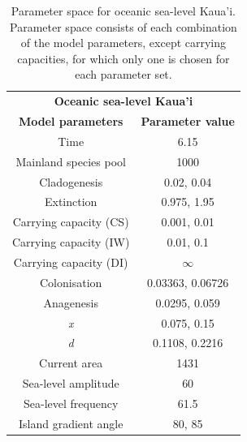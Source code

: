 \begin{table}[ht]
    \centering
    \caption{Parameter space for oceanic sea-level Kaua'i. Parameter space consists of each combination of the model parameters, except carrying capacities, for which only one is chosen for each parameter set.}
    \begin{tabular}{ c | c }
        \multicolumn{2}{c}{\textbf{Oceanic sea-level Kaua'i}} \\
        \textbf{Model parameters} & \textbf{Parameter value} \\ 
        \hline
        \hline
        Time & 6.15 \\
        \hline
        Mainland species pool & 1000 \\
        \hline
        Cladogenesis & 0.02, 0.04 \\
        \hline
        Extinction & 0.975, 1.95 \\
        \hline
        Carrying capacity (CS) & 0.001, 0.01 \\
        \hline
        Carrying capacity (IW) & 0.01, 0.1 \\
        \hline
        Carrying capacity (DI) & $\infty$ \\
        \hline
        Colonisation & 0.03363, 0.06726 \\
        \hline
        Anagenesis & 0.0295, 0.059 \\
        \hline
        \textit{x} & 0.075, 0.15 \\
        \hline
        \textit{d} & 0.1108, 0.2216 \\
        \hline
        Current area & 1431 \\
        \hline
        Sea-level amplitude & 60 \\
        \hline
        Sea-level frequency & 61.5 \\
        \hline
        Island gradient angle & 80, 85 \\
    \end{tabular}
    \label{tab:oceanic_sea_level_old}
\end{table}

